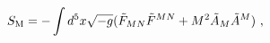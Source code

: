 \begin{equation}
   S_{\rm M}=-\int d^5 x \sqrt{-g}(\tilde{F}_{MN}\tilde{F}^{MN}
                            +M^2 \tilde{A}_M\tilde{A}^M ) \ ,\label{fgaum}
\end{equation}

